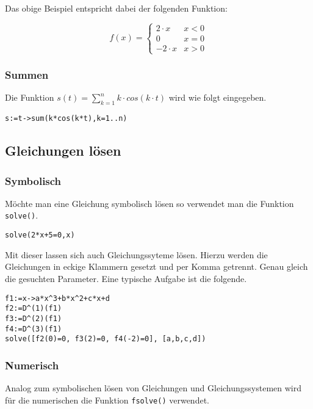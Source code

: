 \noindent
Das obige Beispiel entspricht dabei der folgenden Funktion:

\begin{displaymath}
	f(x) = \left\{
		\begin{array}{lr}
			2 \cdot x &  x < 0 \\
			0 & x = 0 \\
			-2 \cdot x & x > 0
		\end{array}
        \right.
\end{displaymath}


\subsubsection{Summen}
Die Funktion $s(t)=\sum\limits_{k=1}^n k \cdot cos(k \cdot t) $ wird wie folgt
eingegeben.
\begin{lstlisting}[caption=Summen, label=Summen]
s:=t->sum(k*cos(k*t),k=1..n)
\end{lstlisting}

\subsection{Gleichungen lösen}

\subsubsection{Symbolisch}
Möchte man eine Gleichung symbolisch lösen so verwendet man die Funktion
\verb!solve()!.

\begin{lstlisting}[caption=Gleichung symbolisch, label=Gleichungen symbolisch I]
solve(2*x+5=0,x)
\end{lstlisting}

\noindent
Mit dieser lassen sich auch Gleichungssyteme lösen. Hierzu werden die 
Gleichungen in eckige Klammern gesetzt und per Komma getrennt. Genau gleich
die gesuchten Parameter. Eine typische Aufgabe ist die folgende.

\begin{lstlisting}[caption=Gleichungssystem, label=Gleichungssystem]
f1:=x->a*x^3+b*x^2+c*x+d
f2:=D^(1)(f1)
f3:=D^(2)(f1)
f4:=D^(3)(f1)
solve([f2(0)=0, f3(2)=0, f4(-2)=0], [a,b,c,d])
\end{lstlisting}

\subsubsection{Numerisch}
Analog zum symbolischen lösen von Gleichungen und Gleichungssystemen wird
für die numerischen die Funktion \verb!fsolve()! verwendet.

